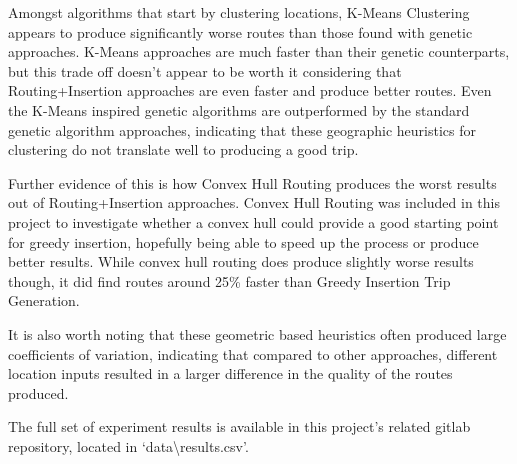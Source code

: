 Amongst algorithms that start by clustering locations, K-Means Clustering appears to produce significantly worse
routes than those found with genetic approaches.
K-Means approaches are much faster than their genetic counterparts, but this trade off doesn't appear to be worth it
considering that Routing+Insertion approaches are even faster and produce better routes.
Even the K-Means inspired genetic algorithms are outperformed by the standard genetic algorithm approaches,
indicating that these geographic heuristics for clustering do not translate well to producing a good trip.

Further evidence of this is how Convex Hull Routing produces the worst results out of Routing+Insertion approaches.
Convex Hull Routing was included in this project to investigate whether a convex hull could provide a good starting
point for greedy insertion, hopefully being able to speed up the process or produce better results.
While convex hull routing does produce slightly worse results though, it did find routes around 25\% faster than
Greedy Insertion Trip Generation.

It is also worth noting that these geometric based heuristics often produced large coefficients of variation,
indicating that compared to other approaches, different location inputs resulted in a larger difference in the quality
of the routes produced.

The full set of experiment results is available in this project's related gitlab repository, located in
`data\textbackslash results.csv'.